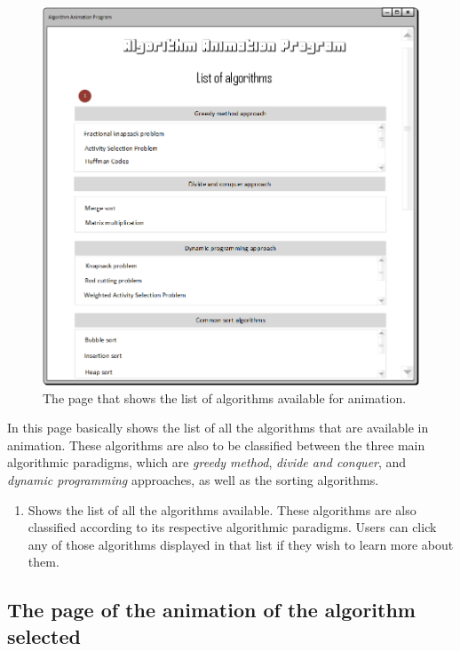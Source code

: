 \begin{figure}[H]
\centering
\hspace*{-0.5cm}
\includegraphics[scale=0.8]{images/report_images/uiListOfAlgorithms.png}
\caption{The page that shows the list of algorithms available for animation.}
\label{uiListOfAlgorithms}
\end{figure}

In this page basically shows the list of all the algorithms that are available in animation. These algorithms are also to be classified between the three main algorithmic paradigms, which are \textit{greedy method}, \textit{divide and conquer}, and \textit{dynamic programming} approaches, as well as the sorting algorithms.

\begin{enumerate}
\item Shows the list of all the algorithms available. These algorithms are also classified according to its respective algorithmic paradigms. Users can click any of those algorithms displayed in that list if they wish to learn more about them.
\end{enumerate}

\subsection{The page of the animation of the algorithm selected}

